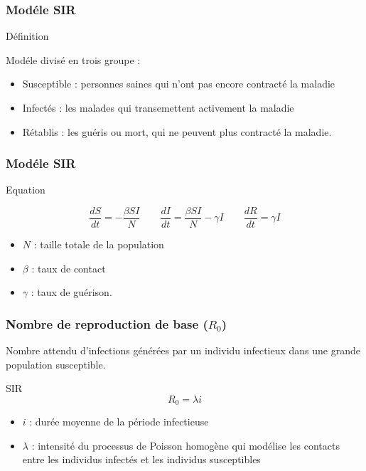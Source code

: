 \begin{frame}
        \frametitle{Modéle SIR}

        \begin{block}{Définition}

                Modéle divisé en trois groupe :
                \begin{itemize}
                        \item Susceptible : personnes saines qui n'ont pas encore contracté la maladie
                        \item Infectés : les malades qui transemettent activement la maladie
                        \item Rétablis : les guéris ou mort, qui ne peuvent plus contracté la maladie.
                \end{itemize}

        \end{block}
\end{frame}

\begin{frame}
        \frametitle{Modéle SIR}

        \begin{alertblock}{Equation}

                $$ \frac{dS}{dt} = -\frac{\beta SI}{N} \qquad \frac{dI}{dt} = \frac{\beta SI}{N} - \gamma I \qquad \frac{dR}{dt} = \gamma I $$

                \begin{itemize}
                        \item $N$ : taille totale de la population
                        \item $\beta$ : taux de contact
                        \item $\gamma$ : taux de guérison.
                \end{itemize}

        \end{alertblock}
\end{frame}

\begin{frame}
        \frametitle{Nombre de reproduction de base ($R_0$)}

        Nombre attendu d’infections générées par un individu infectieux dans une grande population susceptible.

        \begin{alertblock}{SIR}
                $$ R_0 =  \lambda i $$
        \end{alertblock}

        \begin{itemize}
                \item $i$ : durée moyenne de la période infectieuse
                \item $\lambda$ : intensité du processus de Poisson homogène qui modélise les contacts entre les individus infectés et les individus susceptibles
        \end{itemize}
\end{frame}
